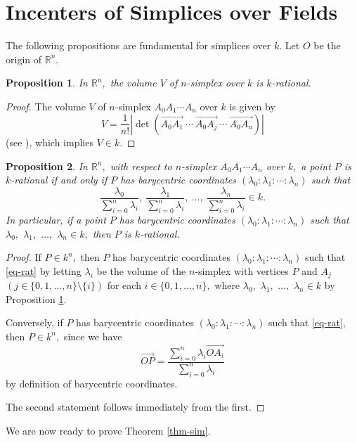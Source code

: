 \documentclass{article}
\theoremstyle{definition}
\theoremstyle{plain}
\newtheorem{prop}{Proposition}
\newenvironment{pf}{\begin{proof}}{\end{proof}}
\begin{document}
\section{Incenters of Simplices over Fields}\label{sec-sim}
The following propositions are fundamental for simplices over $k.$ 
Let $O$ be the origin of $\mathbb R^n.$
\begin{prop}\label{prop-vol-sim}
In $\mathbb R^n,$ the volume $V$ of $n$-simplex over $k$ is $k$-rational.
\end{prop}
\begin{pf}
The volume $V$ of $n$-simplex $A_0A_1\cdots A_n$ over $k$ is given by 
\[ V = \frac{1}{n!}|\det (\overrightarrow{A_0A_1}\ \cdots\ \overrightarrow{A_0A_j}\ \cdots\ \overrightarrow{A_0A_n})|\] 
(see \cite{Ste66}), which implies $V \in k.$
\end{pf}
\begin{prop}\label{prop-rat-pt}
In $\mathbb R^n,$ with respect to $n$-simplex $A_0A_1\cdots A_n$ over $k,$ a point $P$ is $k$-rational if and only if $P$ has barycentric coordinates $(\lambda _0:\lambda _1:\cdots :\lambda _n)$ such that 
\begin{equation} 
\frac{\lambda _0}{\sum _{i = 0}^n\lambda _i},\ \frac{\lambda _1}{\sum _{i = 0}^n\lambda _i},\ \dots,\ \frac{\lambda _n}{\sum _{i = 0}^n\lambda _i} \in k. \label{eq-rat} 
\end{equation} 
In particular, if a point $P$ has barycentric coordinates $(\lambda _0:\lambda _1:\cdots :\lambda _n)$ such that $\lambda _0,$ $\lambda _1,$ $\dots,$ $\lambda _n \in k,$ then $P$ is $k$-rational.
\end{prop}
\begin{pf}
If $P \in k^n,$ then $P$ has barycentric coordinates $(\lambda _0:\lambda _1:\cdots :\lambda _n)$ such that \eqref{eq-rat} by letting $\lambda _i$ be the volume of the $n$-simplex with vertices $P$ and $A_j$ $(j \in \{ 0,1,\dots,n\}\setminus\{ i\})$ for each $i \in \{ 0,1,\dots,n\},$ where $\lambda _0,$ $\lambda _1,$ $\dots,$ $\lambda _n \in k$ by Proposition \ref{prop-vol-sim}.\par
Conversely, if $P$ has barycentric coordinates $(\lambda _0:\lambda _1:\cdots :\lambda _n)$ such that \eqref{eq-rat}, then $P \in k^n,$ since we have 
\[\overrightarrow{OP} = \frac{\sum_{i = 0}^n\lambda _i\overrightarrow{OA_i}}{\sum_{i = 0}^n\lambda _i}\] 
by definition of barycentric coordinates.\par
The second statement follows immediately from the first. 
\end{pf}
We are now ready to prove Theorem \ref{thm-sim}.
\end{document}
